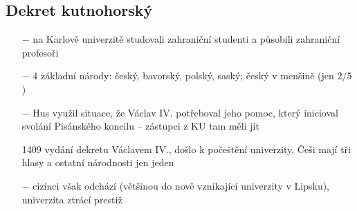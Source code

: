 \documentclass{article}
\begin{document}
\subsection*{Dekret kutnohorský}
\begin{itemize}
    \vspace{-0.5em}
    \setlength\itemsep{0.15em}
    \item[$-$] na Karlově univerzitě studovali zahraniční studenti a působili zahraniční profesoři
    \item[$-$] 4 základní národy: český, bavorský, polský, saský; český v menšině (jen $2/5$)
    \item[$-$] Hus využil situace, že Václav IV. potřeboval jeho pomoc, který inicioval svolání Pisánského koncilu -- zástupci z KU tam měli jít
    \item[1409] vydání dekretu Václavem IV., došlo k počeštění univerzity, Češi mají tři hlasy a ostatní národnosti jen jeden
    \item[$-$] cizinci však odchází (většinou do nově vznikající univerzity v Lipsku), univerzita ztrácí prestiž
\end{itemize}
\end{document}
